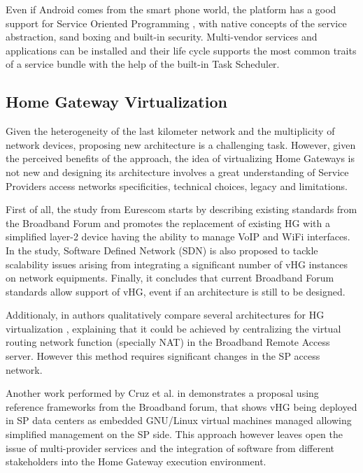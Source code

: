 Even if Android comes from the smart phone world, the platform has a good support for Service Oriented Programming \cite{bieber2001introduction}, with native concepts of the service abstraction, sand boxing and built-in security. Multi-vendor services and applications can be installed and their life cycle supports the most common traits of a service bundle with the help of the built-in Task Scheduler.

\subsection{Home Gateway Virtualization}
Given the heterogeneity of the last kilometer network and the multiplicity of network devices, proposing new architecture is a challenging task.
However, given the perceived benefits of the approach, the idea of virtualizing Home Gateways is not new and designing  its architecture involves a great understanding of Service Providers access networks specificities, technical choices, legacy and limitations.

First of all, the study from Eurescom \cite{daniel_abgrall_virtual_????} starts by describing existing standards from the Broadband Forum \cite{broadband_forum_functional_2014} and promotes the replacement of existing HG  with a simplified layer-2 device having the ability to manage VoIP and WiFi interfaces.
In the study, Software Defined Network (SDN) \cite{kim_improving_2013} is also proposed to tackle scalability issues arising from integrating a significant number of vHG instances on network equipments.
Finally,  it concludes that current Broadband Forum standards allow support of vHG, event if an architecture is still to be designed.

Additionaly, in \cite{da_silva_home_2011} authors qualitatively compare several architectures for HG virtualization , explaining that it could be achieved by centralizing the virtual routing network function (specially NAT) in the Broadband Remote Access server. However this method requires significant changes in the SP access network.

Another work performed by Cruz et al. in \cite{cruz_architecture_2013} demonstrates a proposal using reference frameworks from the Broadband forum, that shows vHG being deployed in SP data centers as embedded GNU/Linux virtual machines managed allowing simplified management on the SP side. This approach however leaves open the issue of multi-provider services and the integration of software from different stakeholders into the Home Gateway execution environment.

